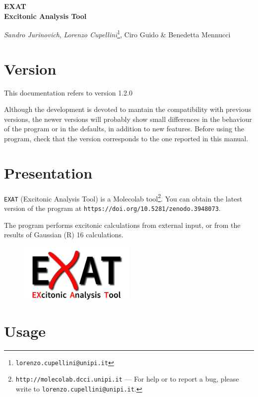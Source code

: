 \documentclass[a4paper,11pt]{article}
\begin{document}
\Large
\begin{center}
\textbf{EXAT \\ Excitonic Analysis Tool}
\end{center}
\normalsize
\begin{center}
\emph{Sandro Jurinovich},
\emph{Lorenzo Cupellini}\footnote{\texttt{lorenzo.cupellini@unipi.it}},
 Ciro Guido \& Benedetta Mennucci
\end{center}

\section{Version}

This documentation refers to version 1.2.0 

Although the development is devoted to mantain the compatibility with previous versions, the newer versions will probably show small differences in the behaviour of the program or in the defaults, in addition to new features. Before using the program, check that the version corresponds to the one reported in this manual.

\section{Presentation}

\texttt{EXAT} (Excitonic Analysis Tool) is a Molecolab tool\footnote{\texttt{http://molecolab.dcci.unipi.it} ---
For help or to report a bug, please write to
\texttt{lorenzo.cupellini@unipi.it}.}. You can obtain the latest version of the program at \texttt{https://doi.org/10.5281/zenodo.3948073}.

The program performs excitonic calculations from external input, or from the results of Gaussian (R) 16 calculations.

\begin{figure}[!hb]
 \centering
 \includegraphics[width=0.5\textwidth]{logo.png}
\end{figure}


\section{Usage}
\end{document}
